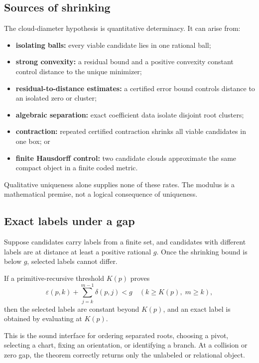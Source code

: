 \subsection{Sources of shrinking}

The cloud-diameter hypothesis is quantitative determinacy.  It can arise from:

\begin{itemize}
\item \textbf{isolating balls:} every viable candidate lies in one rational ball;
\item \textbf{strong convexity:} a residual bound and a positive convexity
      constant control distance to the unique minimizer;
\item \textbf{residual-to-distance estimates:} a certified error bound controls
      distance to an isolated zero or cluster;
\item \textbf{algebraic separation:} exact coefficient data isolate disjoint
      root clusters;
\item \textbf{contraction:} repeated certified contraction shrinks all viable
      candidates in one box; or
\item \textbf{finite Hausdorff control:} two candidate clouds approximate the
      same compact object in a finite coded metric.
\end{itemize}

Qualitative uniqueness alone supplies none of these rates.  The modulus is a
mathematical premise, not a logical consequence of uniqueness.

\subsection{Exact labels under a gap}

Suppose candidates carry labels from a finite set, and candidates with
different labels are at distance at least a positive rational \(g\).  Once the
shrinking bound is below \(g\), selected labels cannot differ.

\begin{corollary}
\label{cor:label-gap}
If a primitive-recursive threshold \(K(p)\) proves
\[
 \varepsilon(p,k)+\sum_{j=k}^{m-1}\delta(p,j)<g
 \quad(k\ge K(p),\;m\ge k),
\]
then the selected labels are constant beyond \(K(p)\), and an exact label is
obtained by evaluating at \(K(p)\).
\end{corollary}

This is the sound interface for ordering separated roots, choosing a pivot,
selecting a chart, fixing an orientation, or identifying a branch.  At a
collision or zero gap, the theorem correctly returns only the unlabeled or
relational object.

